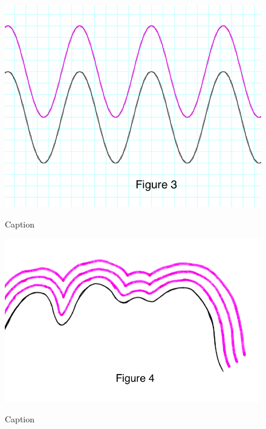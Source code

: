 \begin{figure}[H]
\begin{minipage}[b]{\w}
    \includegraphics[width=\fw]{img/01-intro/03.png}
    \caption{Caption}
    \vspace{4ex}
  \end{minipage} %
  \begin{minipage}[b]{\w}
    \centering
    \label{intro:4}
    \includegraphics[width=\fw]{img/01-intro/04.png}
    \caption{Caption}
    \vspace{4ex}
  \end{minipage} %
\end{figure}

